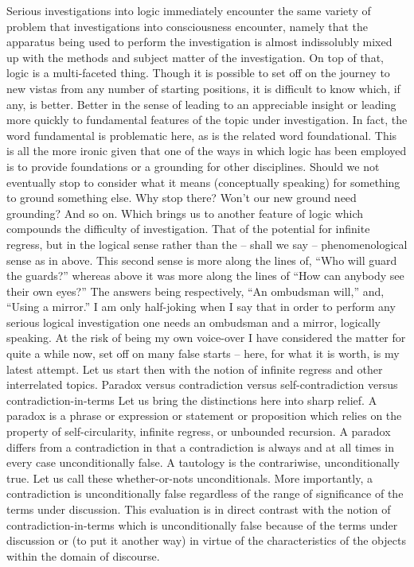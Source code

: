 \documentclass[dah,phd,a4paper]{xe_uccthesis}
\begin{document}
Serious investigations into logic immediately encounter the same variety of problem that investigations into consciousness encounter, namely that the apparatus being used to perform the investigation is almost indissolubly mixed up with the methods and subject matter of the investigation.
On top of that, logic is a multi-faceted thing. Though it is possible to set off on the journey to new vistas from any number of starting positions, it is difficult to know which, if any, is better. Better in the sense of leading to an appreciable insight or leading more quickly to fundamental features of the topic under investigation.
In fact, the word fundamental is problematic here, as is the related word foundational. This is all the more ironic given that one of the ways in which logic has been employed is to provide foundations or a grounding for other disciplines. Should we not eventually stop to consider what it means (conceptually speaking) for something to ground something else. Why stop there? Won't our new ground need grounding? And so on.
Which brings us to another feature of logic which compounds the difficulty of investigation. That of the potential for infinite regress, but in the logical sense rather than the – shall we say – phenomenological sense as in above. This second sense is more along the lines of, “Who will guard the guards?” whereas above it was more along the lines of “How can anybody see their own eyes?” The answers being respectively, “An ombudsman will,” and, “Using a mirror.” I am only half-joking when I say that in order to perform any serious logical investigation one needs an ombudsman and a mirror, logically speaking.
At the risk of being my own voice-over I have considered the matter for quite a while now, set off on many false starts – here, for what it is worth, is my latest attempt. Let us start then with the notion of infinite regress and other interrelated topics.
Paradox versus contradiction versus self-contradiction versus contradiction-in-terms
Let us bring the distinctions here into sharp relief. A paradox is a phrase or expression or statement or proposition which relies on the property of self-circularity, infinite regress, or unbounded recursion. A paradox differs from a contradiction in that a contradiction is always and at all times in every case unconditionally false. A tautology is the contrariwise, unconditionally true. Let us call these whether-or-nots unconditionals. More importantly, a contradiction is unconditionally false regardless of the range of significance of the terms under discussion. This evaluation is in direct contrast with the notion of contradiction-in-terms which is unconditionally false because of the terms under discussion or (to put it another way)  in virtue of the characteristics of the objects within the domain of discourse.
\end{document}
